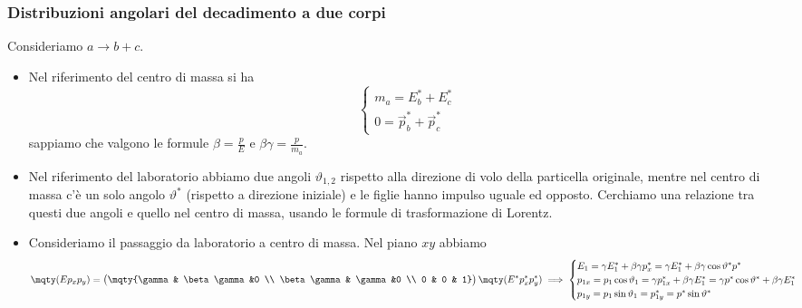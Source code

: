 \subsubsection{Distribuzioni angolari del decadimento a due corpi}
Consideriamo $a\to b+c$. 

\begin{itemize}
    \item Nel riferimento del centro di massa si ha
    \begin{equation*}
        \begin{cases}
            m_a=E_b^*+E_c^*\\
            0=\vec p_b^*+\vec p_c^*
        \end{cases}    
    \end{equation*}
    sappiamo che valgono le formule $\beta=\frac p E$ e $\beta\gamma=\frac p {m_a}$.
    \item Nel riferimento del laboratorio abbiamo due angoli $\vartheta_{1,2}$ rispetto alla direzione di volo della particella originale, mentre nel centro di massa c'è un solo angolo $\vartheta^*$ (rispetto a direzione iniziale) e le figlie hanno impulso uguale ed opposto. Cerchiamo una relazione tra questi due angoli e quello nel centro di massa, usando le formule di trasformazione di Lorentz.
    \item Consideriamo il passaggio da laboratorio a centro di massa. Nel piano $xy$ abbiamo 
    \begin{equation*}
        \mqty(E\\p_x\\p_y)=
        \begin{pmatrix}
            \mqty{\gamma & \beta\gamma&0 \\
            \beta\gamma & \gamma &0 \\
            0 & 0 & 1}
        \end{pmatrix}
        \mqty(E^*\\p^*_x\\p^*_y)
            \implies
            \begin{cases}
                E_1=\gamma E_1^*+\beta\gamma p^*_x=\gamma E_1^*+\beta\gamma\cos\vartheta^* p^*\\
                p_{1x}=p_1\cos\vartheta_1=\gamma p_{1x}^*+\beta\gamma E^*_1=\gamma p^*\cos\vartheta^*+\beta\gamma E^*_1\\
                p_{1y}=p_1\sin\vartheta_1=p_{1y}^*= p^*\sin\vartheta^*
            \end{cases}
        \end{equation*}

\end{itemize}

